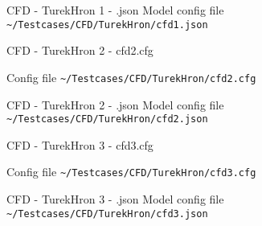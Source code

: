 \begin{frame}{CFD - TurekHron 1 - .json}
Model config file \lstinline{~/Testcases/CFD/TurekHron/cfd1.json}
\vspace{5mm}


\end{frame}





\begin{frame}{CFD - TurekHron 2 - cfd2.cfg}

Config file \lstinline{~/Testcases/CFD/TurekHron/cfd2.cfg}

\vspace{5mm}


\end{frame}


\begin{frame}{CFD - TurekHron 2 - .json}
Model config file \lstinline{~/Testcases/CFD/TurekHron/cfd2.json}
\vspace{5mm}

\end{frame}






\begin{frame}{CFD - TurekHron 3 - cfd3.cfg}

Config file \lstinline{~/Testcases/CFD/TurekHron/cfd3.cfg}

\vspace{5mm}

\end{frame}



\begin{frame}{CFD - TurekHron 3 - .json}
Model config file \lstinline{~/Testcases/CFD/TurekHron/cfd3.json}
\vspace{5mm}

\end{frame}



